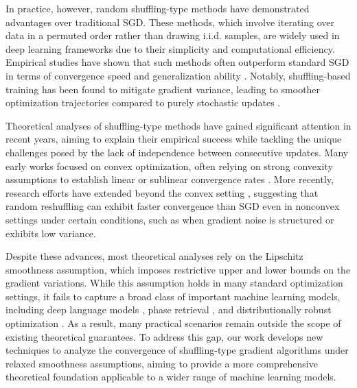 \documentclass{article} %
\theoremstyle{plain}
\theoremstyle{definition}
\theoremstyle{remark}
\begin{document}
In practice, however, random shuffling-type methods have demonstrated advantages over traditional SGD. 
These methods, which involve iterating over data in a permuted order rather than drawing i.i.d. samples, 
are widely used in deep learning frameworks due to their simplicity and computational efficiency. 
Empirical studies have shown that such methods often outperform standard SGD in terms of convergence speed and 
generalization ability \citep{Bo09, Bo12}. 
Notably, shuffling-based training has been found to mitigate gradient variance, 
leading to smoother optimization trajectories compared to purely stochastic updates \citep{GuOzPa21, HaSu19}. 

Theoretical analyses of shuffling-type methods have gained significant attention in recent years, 
aiming to explain their empirical success while tackling the unique challenges posed by 
the lack of independence between consecutive updates. Many early works focused on convex optimization, 
often relying on strong convexity assumptions to establish linear or sublinear convergence rates 
\citep{GuOzPa21, HaSu19, SaSh20}. 
More recently, research efforts have extended beyond the convex setting \citep{mishchenko2020random, nguyen2021unified, koloskova2023shuffle},
suggesting that random reshuffling can exhibit faster convergence than SGD even in nonconvex settings 
under certain conditions, such as when gradient noise is structured or exhibits low variance. 

Despite these advances, most theoretical analyses rely on the Lipschitz smoothness assumption, 
which imposes restrictive upper and lower bounds on the gradient variations. 
While this assumption holds in many standard optimization settings, it fails to capture 
a broad class of important machine learning models, including deep language models \citep{zhang2019gradient}, 
phase retrieval \citep{chen2023generalized}, and distributionally robust optimization \citep{chen2023generalized}. 
As a result, many practical scenarios remain outside the scope of existing theoretical guarantees. 
To address this gap, our work develops new techniques to analyze the convergence of 
shuffling-type gradient algorithms under relaxed smoothness assumptions, 
aiming to provide a more comprehensive theoretical foundation applicable to a wider range of machine learning models.

\end{document}
